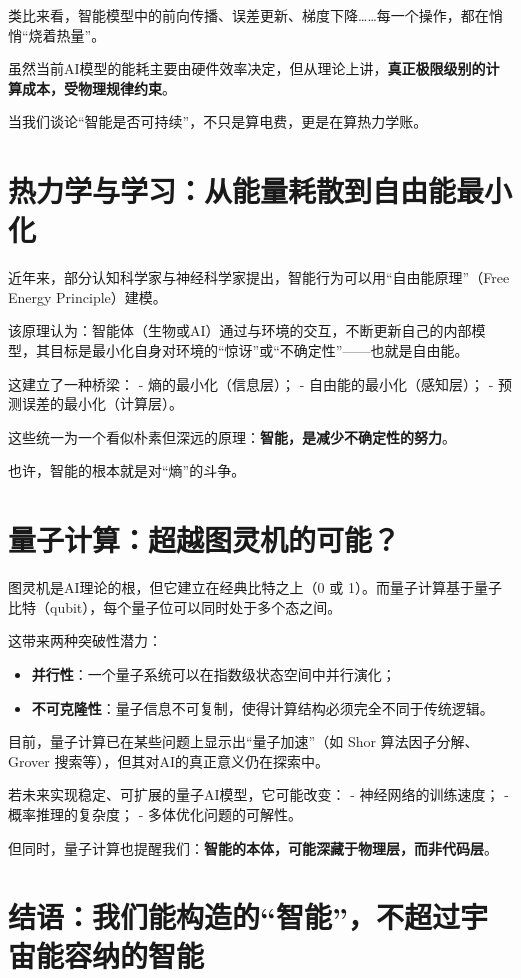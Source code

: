 类比来看，智能模型中的前向传播、误差更新、梯度下降……每一个操作，都在悄悄“烧着热量”。

虽然当前AI模型的能耗主要由硬件效率决定，但从理论上讲，\textbf{真正极限级别的计算成本，受物理规律约束}。

当我们谈论“智能是否可持续”，不只是算电费，更是在算热力学账。

\section*{热力学与学习：从能量耗散到自由能最小化}

近年来，部分认知科学家与神经科学家提出，智能行为可以用“自由能原理”（Free Energy Principle）建模。

该原理认为：智能体（生物或AI）通过与环境的交互，不断更新自己的内部模型，其目标是最小化自身对环境的“惊讶”或“不确定性”——也就是自由能。

这建立了一种桥梁：
- 熵的最小化（信息层）；
- 自由能的最小化（感知层）；
- 预测误差的最小化（计算层）。

这些统一为一个看似朴素但深远的原理：\textbf{智能，是减少不确定性的努力}。

也许，智能的根本就是对“熵”的斗争。

\section*{量子计算：超越图灵机的可能？}

图灵机是AI理论的根，但它建立在经典比特之上（0 或 1）。而量子计算基于量子比特（qubit），每个量子位可以同时处于多个态之间。

这带来两种突破性潜力：

\begin{itemize}
\item \textbf{并行性}：一个量子系统可以在指数级状态空间中并行演化；
\item \textbf{不可克隆性}：量子信息不可复制，使得计算结构必须完全不同于传统逻辑。
\end{itemize}

目前，量子计算已在某些问题上显示出“量子加速”（如 Shor 算法因子分解、Grover 搜索等），但其对AI的真正意义仍在探索中。

若未来实现稳定、可扩展的量子AI模型，它可能改变：
- 神经网络的训练速度；
- 概率推理的复杂度；
- 多体优化问题的可解性。

但同时，量子计算也提醒我们：\textbf{智能的本体，可能深藏于物理层，而非代码层}。

\section*{结语：我们能构造的“智能”，不超过宇宙能容纳的智能}

